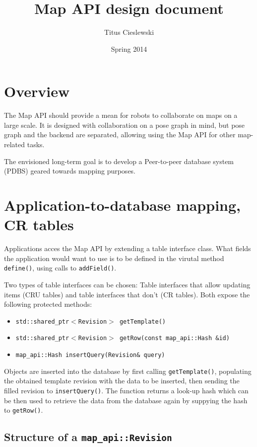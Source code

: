 \documentclass{article}
\title{Map API design document}
\author{Titus Cieslewski}
\date{Spring 2014}
\begin{document}
\maketitle

\section{Overview}

The Map API should provide a mean for robots to collaborate on maps on a large
scale. It is designed with collaboration on a pose graph in mind, but pose
graph and the backend are separated, allowing using the Map API for other
map-related tasks.

The envisioned long-term goal is to develop a Peer-to-peer database system
(PDBS) geared towards mapping purposes.

\section{Application-to-database mapping, CR tables}

Applications acces the Map API by extending a table interface class. What
fields the application would want to use is to be defined in the virutal
method {\tt define()}, using calls to {\tt addField()}. 

Two types of table interfaces can be chosen: Table interfaces that allow
updating items (CRU tables) and table interfaces that don't (CR tables). 
Both expose the following protected methods:

\begin{itemize} \itemsep0em
  \item {\tt std::shared\_ptr$<$Revision$>$ getTemplate()}
  \item {\tt std::shared\_ptr$<$Revision$>$ getRow(const map\_api::Hash \&id)}
  \item {\tt map\_api::Hash insertQuery(Revision\& query)}
\end{itemize}

Objects are inserted into the database by first calling {\tt getTemplate()},
populating the obtained template revision with the data to be inserted, then 
sending
the filled revision to {\tt insertQuery()}. The function returns a look-up
hash which can be then used to retrieve the data from the database again by
suppying the hash to {\tt getRow()}.

\subsection{Structure of a {\tt map\_api::Revision}}
\end{document}
